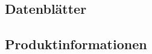 %


%
%
%
%

%


\subsection{Datenblätter}
\label{app:Datenblätter}

\subsection{Produktinformationen}
\label{app:Produktinformationen}



